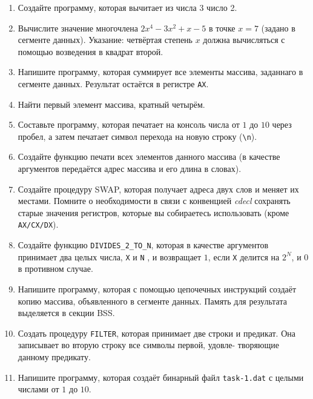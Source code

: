 
\begin{enumerate}
	\item Создайте программу, которая вычитает из числа 3 число 2.

	\item Вычислите значение многочлена $2x^4-3x^2+x-5$
	в точке $x = 7$ (задано в сегменте данных). 
	Указание: четвёртая степень $x$ должна вычисляться с помощью возведения в квадрат второй.

	\item Напишите программу, которая суммирует все элементы массива, заданнаго в сегменте данных. Результат остаётся в регистре \texttt{AX}.

	\item Найти первый элемент массива, кратный четырём.

	\item Составьте программу, которая печатает на консоль числа от $1$ до $10$ через пробел, а затем печатает символ перехода на новую строку (\texttt{\textbackslash{}n}).

	\item Создайте функцию печати всех элементов данного массива (в качестве аргументов передаётся адрес массива и его длина в словах).

	\item Создайте процедуру SWAP, которая получает адреса
	двух слов и меняет их местами. Помните о необходимости в связи с конвенцией \textit{cdecl} сохранять старые значения регистров, которые вы собираетесь использовать (кроме
	\texttt{AX/CX/DX}).

	\item Создайте функцию \texttt{DIVIDES\_2\_TO\_N}, которая
	в качестве аргументов принимает два целых числа, \texttt{X} и \texttt{N} , и возвращает $1$,
	если \texttt{X} делится на $2^N$, и $0$ в противном случае.

	\item Напишите программу, которая с помощью цепочечных инструкций создаёт копию массива,
	объявленного в сегменте данных. Память для результата выделяется в
	секции BSS.

	\item Создать процедуру \texttt{FILTER}, которая принимает две строки и
	предикат. Она записывает во вторую строку все символы первой, удовле-
	творяющие данному предикату.

	\item Напишите программу, которая создаёт бинарный файл \texttt{task-1.dat} с целыми числами от $1$ до $10$.


\end{enumerate}
